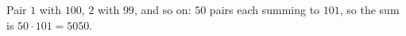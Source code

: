 Pair $1$ with $100$, $2$ with $99$, and so on: $50$ pairs each summing to $101$, so the sum is $50\cdot101=\boxed{5050}$.
